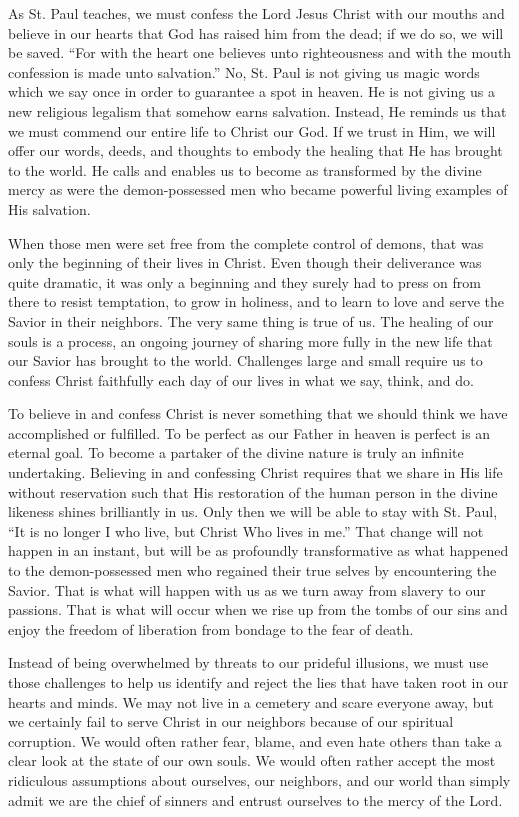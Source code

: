 \documentclass[twoside, letterpaper, 12pt]{report}
\begin{document}
\begin{maybetwocolumns}
As St. Paul teaches, we must confess the Lord Jesus Christ with our mouths and believe in our hearts
that God has raised him from the dead; if we do so, we will be saved.  “For with the heart one
believes unto righteousness and with the mouth confession is made unto salvation.”   No, St. Paul is
not giving us magic words which we say once in order to guarantee a spot in heaven.  He is not
giving us a new religious legalism that somehow earns salvation.  Instead, He reminds us that we
must commend our entire life to Christ our God.  If we trust in Him, we will offer our words, deeds,
and thoughts to embody the healing that He has brought to the world.  He calls and enables us to
become as transformed by the divine mercy as were the demon-possessed men who became powerful living
examples of His salvation.

When those men were set free from the complete control of demons, that was only the beginning of
their lives in Christ.  Even though their deliverance was quite dramatic, it was only a beginning
and they surely had to press on from there to resist temptation, to grow in holiness, and to learn
to love and serve the Savior in their neighbors.  The very same thing is true of us.  The healing of
our souls is a process, an ongoing journey of sharing more fully in the new life that our Savior has
brought to the world.  Challenges large and small require us to confess Christ faithfully each day
of our lives in what we say, think, and do.

To believe in and confess Christ is never something that we should think we have accomplished or
fulfilled.  To be perfect as our Father in heaven is perfect is an eternal goal.  To become a
partaker of the divine nature is truly an infinite undertaking.  Believing in and confessing Christ
requires that we share in His life without reservation such that His restoration of the human person
in the divine likeness shines brilliantly in us.  Only then we will be able to stay with St. Paul,
“It is no longer I who live, but Christ Who lives in me.”    That change will not happen in an
instant, but will be as profoundly transformative as what happened to the demon-possessed men who
regained their true selves by encountering the Savior.  That is what will happen with us as we turn
away from slavery to our passions.  That is what will occur when we rise up from the tombs of our
sins and enjoy the freedom of liberation from bondage to the fear of death.

Instead of being overwhelmed by threats to our prideful illusions, we must use those challenges to
help us identify and reject the lies that have taken root in our hearts and minds.  We may not live
in a cemetery and scare everyone away, but we certainly fail to serve Christ in our neighbors
because of our spiritual corruption.  We would often rather fear, blame, and even hate others than
take a clear look at the state of our own souls.  We would often rather accept the most ridiculous
assumptions about ourselves, our neighbors, and our world than simply admit we are the chief of
sinners and entrust ourselves to the mercy of the Lord.


\end{maybetwocolumns}
\end{document}
